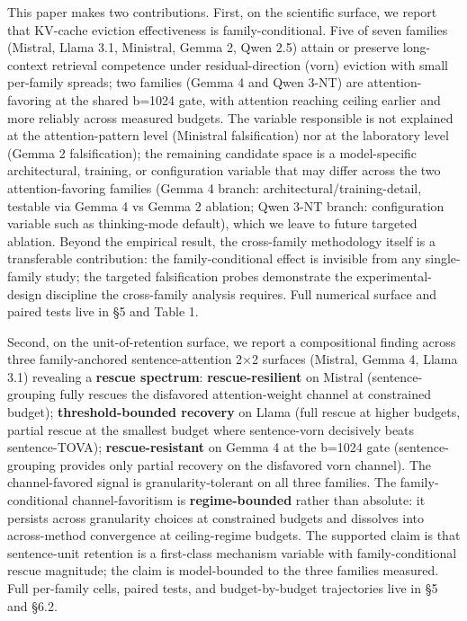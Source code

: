 \documentclass[
]{article}
\begin{document}
This paper makes two contributions. First, on the scientific surface,
we report that KV-cache eviction effectiveness is family-conditional.
Five of seven families (Mistral, Llama 3.1, Ministral, Gemma 2,
Qwen 2.5) attain or preserve long-context retrieval competence under
residual-direction (vorn) eviction with small per-family spreads; two families
(Gemma 4 and Qwen 3-NT) are attention-favoring at the shared b=1024
gate, with attention reaching ceiling earlier and more reliably
across measured budgets. The variable responsible is not explained
at the attention-pattern level (Ministral falsification) nor at the
laboratory level (Gemma 2 falsification); the remaining candidate space
is a model-specific architectural, training, or configuration variable
that may differ across the two attention-favoring families (Gemma 4
branch: architectural/training-detail, testable via Gemma 4 vs Gemma 2
ablation; Qwen 3-NT branch: configuration variable such as
thinking-mode default), which we leave to future targeted ablation. Beyond the empirical result, the
cross-family methodology itself is a transferable contribution: the
family-conditional effect is invisible from any single-family study; the
targeted falsification probes demonstrate the experimental-design
discipline the cross-family analysis requires. Full numerical surface
and paired tests live in §5 and Table 1.

Second, on the unit-of-retention surface, we report a compositional
finding across three family-anchored sentence-attention 2×2 surfaces
(Mistral, Gemma 4, Llama 3.1) revealing a \textbf{rescue spectrum}:
\textbf{rescue-resilient} on Mistral (sentence-grouping fully rescues
the disfavored attention-weight channel at constrained budget);
\textbf{threshold-bounded recovery} on Llama (full rescue at higher
budgets, partial rescue at the smallest budget where sentence-vorn
decisively beats sentence-TOVA); \textbf{rescue-resistant} on Gemma 4 at
the b=1024 gate (sentence-grouping provides only partial recovery on the
disfavored vorn channel). The channel-favored signal is
granularity-tolerant on all three families. The family-conditional
channel-favoritism is \textbf{regime-bounded} rather than absolute: it
persists across granularity choices at constrained budgets and dissolves
into across-method convergence at ceiling-regime budgets. The supported
claim is that sentence-unit retention is a first-class mechanism
variable with family-conditional rescue magnitude; the claim is
model-bounded to the three families measured. Full per-family cells,
paired tests, and budget-by-budget trajectories live in §5 and §6.2.
\end{document}
